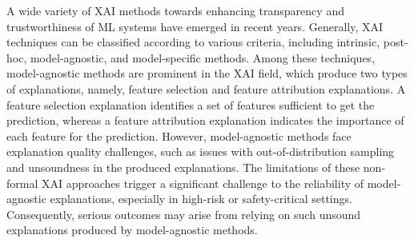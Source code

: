 A wide variety of XAI methods towards enhancing transparency and trustworthiness of ML systems
have emerged in recent years.
%
Generally, XAI techniques can be classified according to various criteria, including intrinsic, 
post-hoc, model-agnostic, and model-specific methods.
%
Among these techniques, model-agnostic methods are prominent in the XAI field,
which produce two types of explanations, namely, feature selection and
feature attribution explanations.
%
A feature selection explanation identifies a set of features sufficient to get the prediction, 
whereas a feature attribution explanation indicates the importance of each feature for the prediction.
%
However, model-agnostic methods face explanation quality challenges, such as issues with 
out-of-distribution sampling and unsoundness in the produced explanations.
%
The limitations of these non-formal XAI approaches trigger a significant challenge 
to the reliability of model-agnostic explanations, especially in high-risk or 
safety-critical settings.
%
Consequently, serious outcomes may arise from relying on such unsound
explanations produced by model-agnostic methods.


